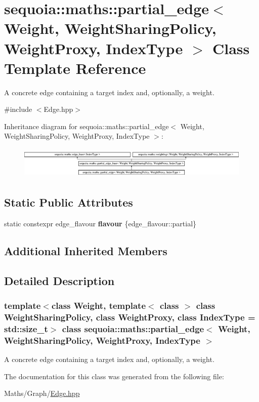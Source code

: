 \hypertarget{classsequoia_1_1maths_1_1partial__edge}{}\section{sequoia\+::maths\+::partial\+\_\+edge$<$ Weight, Weight\+Sharing\+Policy, Weight\+Proxy, Index\+Type $>$ Class Template Reference}
\label{classsequoia_1_1maths_1_1partial__edge}


A concrete edge containing a target index and, optionally, a weight.  




{\ttfamily \#include $<$Edge.\+hpp$>$}

Inheritance diagram for sequoia\+::maths\+::partial\+\_\+edge$<$ Weight, Weight\+Sharing\+Policy, Weight\+Proxy, Index\+Type $>$\+:\begin{figure}[H]
\begin{center}
\leavevmode
\includegraphics[height=1.538462cm]{classsequoia_1_1maths_1_1partial__edge}
\end{center}
\end{figure}
\subsection*{Static Public Attributes}
\begin{DoxyCompactItemize}
\item 
\mbox{\label{classsequoia_1_1maths_1_1partial__edge_af209b3347f4c9edb43cf1f648605e30d}} 
static constexpr edge\+\_\+flavour {\bfseries flavour} \{edge\+\_\+flavour\+::partial\}
\end{DoxyCompactItemize}
\subsection*{Additional Inherited Members}


\subsection{Detailed Description}
\subsubsection*{template$<$class Weight, template$<$ class $>$ class Weight\+Sharing\+Policy, class Weight\+Proxy, class Index\+Type = std\+::size\+\_\+t$>$\newline
class sequoia\+::maths\+::partial\+\_\+edge$<$ Weight, Weight\+Sharing\+Policy, Weight\+Proxy, Index\+Type $>$}

A concrete edge containing a target index and, optionally, a weight. 

The documentation for this class was generated from the following file\+:\begin{DoxyCompactItemize}
\item 
Maths/\+Graph/\mbox{\hyperlink{_edge_8hpp}{Edge.\+hpp}}\end{DoxyCompactItemize}

